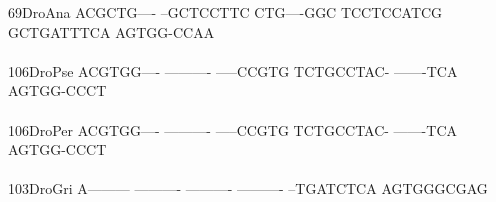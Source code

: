 \documentclass[11pt,twoside,reqno,a4paper]{article}
\begin{document}
{69\hspace*{2\charwidth}DroAna	ACGCTG----	--GCTCCTTC	CTG----GGC	TCCTCCATCG	GCTGATTTCA	AGTGG-CCAA	\\
\hspace*{4\charwidth}\hspace*{7\charwidth}\hspace*{1\charwidth}\hspace*{1\charwidth}\hspace*{1\charwidth}\hspace*{1\charwidth}\hspace*{1\charwidth}\hspace*{1\charwidth}\\
106\hspace*{1\charwidth}DroPse	ACGTGG----	----------	-----CCGTG	TCTGCCTAC-	-------TCA	AGTGG-CCCT	\\
\hspace*{4\charwidth}\hspace*{7\charwidth}\hspace*{1\charwidth}\hspace*{1\charwidth}\hspace*{1\charwidth}\hspace*{1\charwidth}\hspace*{1\charwidth}\hspace*{1\charwidth}\\
106\hspace*{1\charwidth}DroPer	ACGTGG----	----------	-----CCGTG	TCTGCCTAC-	-------TCA	AGTGG-CCCT	\\
\hspace*{4\charwidth}\hspace*{7\charwidth}\hspace*{1\charwidth}\hspace*{1\charwidth}\hspace*{1\charwidth}\hspace*{1\charwidth}\hspace*{1\charwidth}\hspace*{1\charwidth}\\
103\hspace*{1\charwidth}DroGri	A---------	----------	----------	----------	--TGATCTCA	AGTGGGCGAG	\\
\hspace*{4\charwidth}\hspace*{7\charwidth}\hspace*{1\charwidth}\hspace*{1\charwidth}\hspace*{1\charwidth}\hspace*{1\charwidth}\hspace*{1\charwidth}\hspace*{1\charwidth}\\
}
\end{document}
